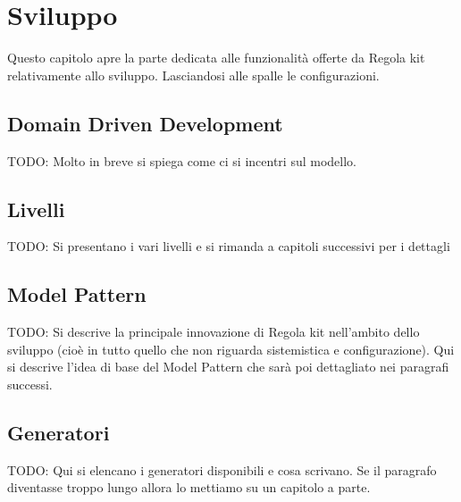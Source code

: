 \chapter{Sviluppo}
Questo capitolo apre la parte dedicata alle funzionalità offerte da Regola kit relativamente allo sviluppo. Lasciandosi alle spalle le configurazioni.

\section{Domain Driven Development}
TODO: Molto in breve si spiega come ci si incentri sul modello.

\section{Livelli}
TODO: Si presentano i vari livelli e si rimanda a capitoli successivi per i dettagli

\section{Model Pattern}
TODO: Si descrive la principale innovazione di Regola kit nell'ambito dello sviluppo (cioè in tutto quello che non riguarda sistemistica e configurazione). Qui si descrive l'idea di base del Model Pattern che sarà poi dettagliato nei paragrafi successi.

\section{Generatori}\label{sec:generatori}
TODO: Qui si elencano i generatori disponibili e cosa scrivano. Se il paragrafo diventasse troppo lungo allora lo mettiamo su un capitolo a parte.